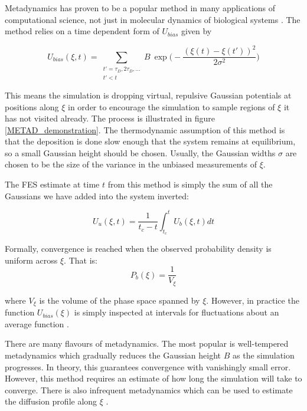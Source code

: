 Metadynamics has proven to be a popular method in many applications of computational science, not just in molecular dynamics of biological systems \cite{cheng2017}\cite{giberti2015}\cite{bussi2020a}. The method relies on a time dependent form of $U_{bias}$ given by 

\begin{equation}
	U_{bias} (\xi,t) = \sum\limits_{\substack{t' = \tau_D, 2 \tau_D,... \\ t' < t}}  B \ \exp\bigg( - \frac{(\xi(t) - \xi(t') )^2}{2\sigma^2 }\bigg)
\end{equation}

This means the simulation is dropping virtual, repulsive Gaussian potentials at positions along $\xi$ in order to encourage the simulation to sample regions of $\xi$ it has not visited already. The process is illustrated in figure \ref{METAD_demonstration}. The thermodynamic assumption of this method is that the deposition is done slow enough that the system remains at equilibrium, so a small Gaussian height should be chosen. Usually, the Gaussian widths $\sigma$ are chosen to be the size of the variance in the unbiased measurements of $\xi$. 

The FES estimate at time $t$ from this method is simply the sum of all the Gaussians we have added into the system inverted:  

\begin{equation}
	U_u (\xi,t)  =  \frac{1}{t_c-t} \int_{t_c}^t U_b(\xi,t) dt
\end{equation}

Formally, convergence is reached when the observed probability density is uniform across $\xi$. That is:
\begin{equation}
	P_b (\xi)= \frac{1}{V_\xi } 
	\label{convergence_criterion_metad}
\end{equation}

where $V_\xi$ is the volume of the phase space spanned by $\xi$. However, in practice the function $U_{bias}(\xi)$ is simply inspected at intervals for fluctuations about an average function \cite{sun2016}. 

There are many flavours of metadynamics. The most popular is well-tempered metadynamics which gradually reduces the Gaussian height $B$ as the simulation progresses\cite{barducci2008}. In theory, this guarantees convergence with vanishingly small error. However, this method requires an estimate of how long the simulation will take to converge. There is also infrequent metadynamics which can be used to estimate the diffusion profile along $\xi$ \cite{tiwary2013}\cite{tiwary2016}\cite{salvalaglio2014}.  

